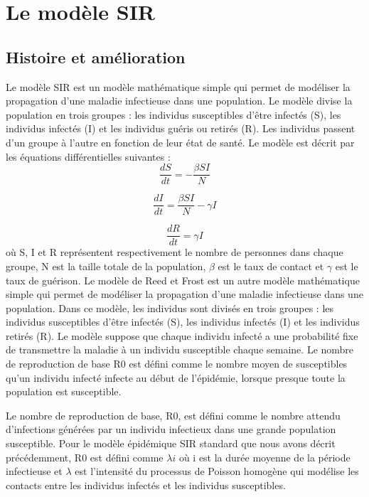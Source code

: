 \section{Le modèle SIR}
        \subsection{Histoire et amélioration}

	Le modèle SIR est un modèle mathématique simple qui permet de modéliser la propagation d'une maladie infectieuse dans une population. Le modèle divise la population en trois groupes : les individus susceptibles d'être infectés (S), les individus infectés (I) et les individus guéris ou retirés (R). Les individus passent d'un groupe à l'autre en fonction de leur état de santé. Le modèle est décrit par les équations différentielles suivantes :
$$\frac{dS}{dt} = -\frac{\beta SI}{N}$$

$$\frac{dI}{dt} = \frac{\beta SI}{N} - \gamma I$$

$$\frac{dR}{dt} = \gamma I$$
où S, I et R représentent respectivement le nombre de personnes dans chaque groupe, N est la taille totale de la population, $\beta$ est le taux de contact et $\gamma$ est le taux de guérison. Le modèle de Reed et Frost est un autre modèle mathématique simple qui permet de modéliser la propagation d'une maladie infectieuse dans une population. Dans ce modèle, les individus sont divisés en trois groupes : les individus susceptibles d'être infectés (S), les individus infectés (I) et les individus retirés (R). Le modèle suppose que chaque individu infecté a une probabilité fixe de transmettre la maladie à un individu susceptible chaque semaine. Le nombre de reproduction de base R0 est défini comme le nombre moyen de susceptibles qu'un individu infecté infecte au début de l'épidémie, lorsque presque toute la population est susceptible.

Le nombre de reproduction de base, R0, est défini comme le nombre attendu d'infections générées par un individu infectieux dans une grande population susceptible. Pour le modèle épidémique SIR standard que nous avons décrit précédemment, R0 est défini comme $\lambda i$ où i est la durée moyenne de la période infectieuse et $\lambda$ est l'intensité du processus de Poisson homogène qui modélise les contacts entre les individus infectés et les individus susceptibles.

